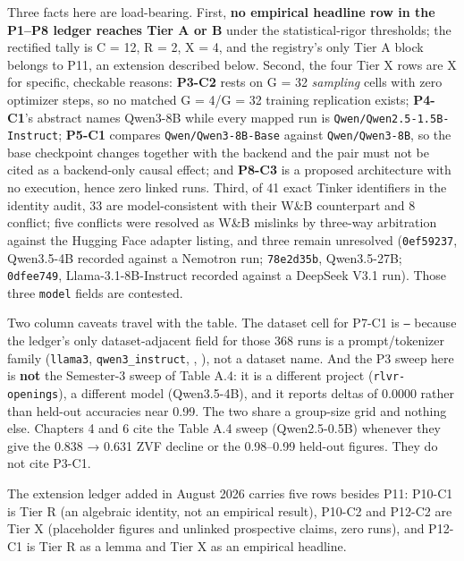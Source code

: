 \documentclass[12pt,a4paper]{report}
\newcommand{\longtok}[1]{\texttt{\seqsplit{#1}}}
\begin{document}
Three facts here are load-bearing. First, \textbf{no empirical headline
row in the P1--P8 ledger reaches Tier A or B} under the
statistical-rigor thresholds; the rectified tally is C = 12, R = 2, X =
4, and the registry's only Tier A block belongs to P11, an extension
described below. Second, the four Tier X rows are X for specific,
checkable reasons: \textbf{P3-C2} rests on G = 32 \emph{sampling} cells
with zero optimizer steps, so no matched G = 4/G = 32 training
replication exists; \textbf{P4-C1}'s abstract names Qwen3-8B while every
mapped run is \texttt{Qwen/Qwen2.5-1.5B-Instruct}; \textbf{P5-C1}
compares \texttt{Qwen/Qwen3-8B-Base} against \texttt{Qwen/Qwen3-8B}, so
the base checkpoint changes together with the backend and the pair must
not be cited as a backend-only causal effect; and \textbf{P8-C3} is a
proposed architecture with no execution, hence zero linked runs. Third,
of 41 exact Tinker identifiers in the identity audit, 33 are
model-consistent with their W\&B counterpart and 8 conflict; five
conflicts were resolved as W\&B mislinks by three-way arbitration
against the Hugging Face adapter listing, and three remain unresolved
(\texttt{0ef59237}, Qwen3.5-4B recorded against a Nemotron run;
\texttt{78e2d35b}, Qwen3.5-27B; \texttt{0dfee749}, Llama-3.1-8B-Instruct
recorded against a DeepSeek V3.1 run). Those three \texttt{model} fields
are contested.

Two column caveats travel with the table. The dataset cell for P7-C1 is
\texttt{—} because the ledger's only dataset-adjacent field for those
368 runs is a prompt/tokenizer family (\texttt{llama3},
\texttt{qwen3\_instruct}, \longtok{gpt\_\allowbreak{}oss\_\allowbreak{}low\_\allowbreak{}reasoning},
\longtok{nemotron3\_\allowbreak{}disable\_\allowbreak{}thinking}), not a dataset name. And the P3
sweep here is \textbf{not} the Semester-3 sweep of Table A.4: it is a
different project (\texttt{rlvr-openings}), a different model
(Qwen3.5-4B), and it reports deltas of 0.0000 rather than held-out
accuracies near 0.99. The two share a group-size grid and nothing else.
Chapters 4 and 6 cite the Table A.4 sweep (Qwen2.5-0.5B) whenever they
give the 0.838 → 0.631 ZVF decline or the 0.98--0.99 held-out figures.
They do not cite P3-C1.

The extension ledger added in August 2026 carries five rows besides P11:
P10-C1 is Tier R (an algebraic identity, not an empirical result),
P10-C2 and P12-C2 are Tier X (placeholder figures and unlinked
prospective claims, zero runs), and P12-C1 is Tier R as a lemma and Tier
X as an empirical headline.
\end{document}
